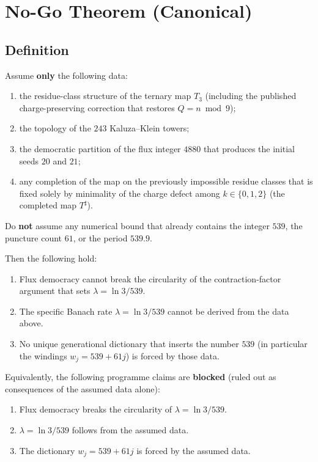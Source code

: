 
\chapter{No-Go Theorem (Canonical)}
\label{ch:nogo-canonical}

\section{Definition}

\begin{theorem}[No-Go]
\label{thm:nogo-canonical}
Assume \textbf{only} the following data:
\begin{enumerate}[label=(\roman*)]
  \item the residue-class structure of the ternary map \(T_3\) (including the
        published charge-preserving correction that restores
        \(Q=n\bmod 9\));
  \item the topology of the \(243\) Kaluza--Klein towers;
  \item the democratic partition of the flux integer \(4880\) that produces
        the initial seeds \(20\) and \(21\);
  \item any completion of the map on the previously impossible residue classes
        that is fixed solely by minimality of the charge defect among
        \(k\in\{0,1,2\}\) (the completed map \(T^\sharp\)).
\end{enumerate}
Do \textbf{not} assume any numerical bound that already contains the integer
\(539\), the puncture count \(61\), or the period \(539.9\).

Then the following hold:
\begin{enumerate}[label=(\alph*)]
  \item Flux democracy cannot break the circularity of the contraction-factor
        argument that sets \(\lambda=\ln 3/539\).
  \item The specific Banach rate \(\lambda=\ln 3/539\) cannot be derived from
        the data above.
  \item No unique generational dictionary that inserts the number \(539\)
        (in particular the windings \(w_j=539+61j\)) is forced by those data.
\end{enumerate}
Equivalently, the following programme claims are \textbf{blocked} (ruled out as
consequences of the assumed data alone):
\begin{enumerate}[label=(\alph*$'$)]
  \item Flux democracy breaks the circularity of \(\lambda=\ln 3/539\).
  \item \(\lambda=\ln 3/539\) follows from the assumed data.
  \item The dictionary \(w_j=539+61j\) is forced by the assumed data.
\end{enumerate}
\end{theorem}

